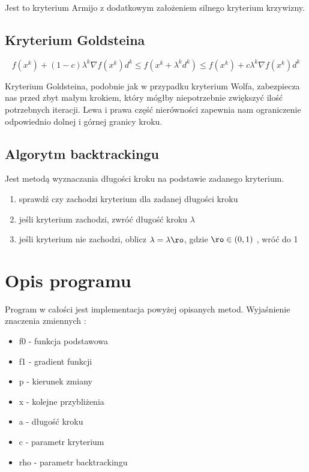 \documentclass{classrep}
\begin{document}
Jest to kryterium Armijo z dodatkowym założeniem silnego kryterium krzywizny.

\subsection{Kryterium Goldsteina}

\begin{equation}
f( x^{k} ) + (1-c) \lambda ^{k} \nabla f(x^{k}) d^{k} \leq f(x^{k}+ \lambda ^{k} d^{k} ) \leq f(x^{k}) + c \lambda ^{k} \nabla f(x^{k} ) d^{k}
\end{equation}

Kryterium Goldsteina, podobnie jak w przypadku kryterium Wolfa, zabezpiecza nas przed zbyt małym krokiem, który mógłby niepotrzebnie zwiększyć ilość potrzebnych iteracji. Lewa i prawa część nierówności zapewnia nam ograniczenie odpowiednio dolnej i górnej granicy kroku.

\subsection{Algorytm backtrackingu}
Jest metodą wyznaczania długości kroku na podstawie zadanego kryterium.
\begin{enumerate}
\item sprawdź czy zachodzi kryterium dla zadanej długości kroku
\item jeśli kryterium zachodzi, zwróć długość kroku $\lambda$
\item jeśli kryterium nie zachodzi, oblicz $\lambda=\lambda \ro$, gdzie $\ro \in (0,1)$ , wróć do 1
\end{enumerate}



\section{Opis programu}
Program w całości jest implementacja powyżej opisanych metod. 
Wyjaśnienie znaczenia zmiennych :
\begin{itemize}
\item f0 - funkcja podstawowa
\item f1 - gradient funkcji
\item p - kierunek zmiany
\item x - kolejne przybliżenia
\item a - długość kroku
\item c - parametr kryterium
\item rho - parametr backtrackingu
\end{itemize}
\end{document}
